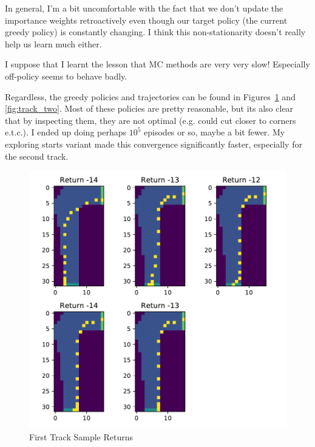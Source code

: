 \documentclass{article}
\begin{document}
In general, I'm a bit uncomfortable with the fact that we don't update the importance weights retroactively even though our target policy (the current greedy policy) is constantly changing. I think this non-stationarity doesn't really help us learn much either. 

I suppose that I learnt the lesson that MC methods are very very slow! Especially off-policy seems to behave badly. 

Regardless, the greedy policies and trajectories can be found in Figures~\ref{fig:track_one} and  \ref{fig:track_two}. Most of these policies are pretty reasonable, but its also clear that by inspecting them, they are not optimal (e.g. could cut closer to corners e.t.c.). I ended up doing perhaps $10^5$ episodes or so, maybe a bit fewer. My exploring starts variant made this convergence significantly faster, especially for the second track. 

\begin{figure}
	\includegraphics[width=\textwidth]{one}
	\centering
	\caption{\label{fig:track_one} First Track Sample Returns}
\end{figure}
\end{document}
